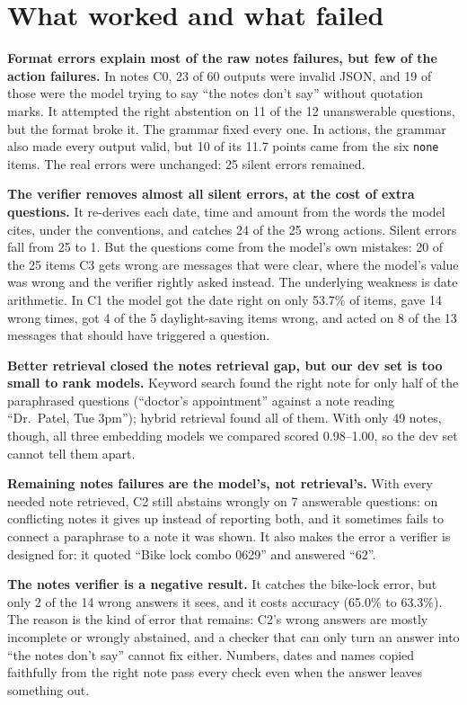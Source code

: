 \documentclass[10pt,letterpaper]{article}
\begin{document}
\section{What worked and what failed}
\textbf{Format errors explain most of the raw notes failures, but few of the action failures.} In notes C0, 23 of 60 outputs were invalid JSON, and 19 of those were the model trying to say ``the notes don't say'' without quotation marks. It attempted the right abstention on 11 of the 12 unanswerable questions, but the format broke it. The grammar fixed every one. In actions, the grammar also made every output valid, but 10 of its 11.7 points came from the six \texttt{none} items. The real errors were unchanged: 25 silent errors remained.

\textbf{The verifier removes almost all silent errors, at the cost of extra questions.} It re-derives each date, time and amount from the words the model cites, under the conventions, and catches 24 of the 25 wrong actions. Silent errors fall from 25 to 1. But the questions come from the model's own mistakes: 20 of the 25 items C3 gets wrong are messages that were clear, where the model's value was wrong and the verifier rightly asked instead. The underlying weakness is date arithmetic. In C1 the model got the date right on only 53.7\% of items, gave 14 wrong times, got 4 of the 5 daylight-saving items wrong, and acted on 8 of the 13 messages that should have triggered a question.

\textbf{Better retrieval closed the notes retrieval gap, but our dev set is too small to rank models.} Keyword search found the right note for only half of the paraphrased questions (``doctor's appointment'' against a note reading ``Dr.\ Patel, Tue 3pm''); hybrid retrieval found all of them. With only 49 notes, though, all three embedding models we compared scored 0.98--1.00, so the dev set cannot tell them apart.

\textbf{Remaining notes failures are the model's, not retrieval's.} With every needed note retrieved, C2 still abstains wrongly on 7 answerable questions: on conflicting notes it gives up instead of reporting both, and it sometimes fails to connect a paraphrase to a note it was shown. It also makes the error a verifier is designed for: it quoted ``Bike lock combo 0629'' and answered ``62''.

\textbf{The notes verifier is a negative result.} It catches the bike-lock error, but only 2 of the 14 wrong answers it sees, and it costs accuracy (65.0\% to 63.3\%). The reason is the kind of error that remains: C2's wrong answers are mostly incomplete or wrongly abstained, and a checker that can only turn an answer into ``the notes don't say'' cannot fix either. Numbers, dates and names copied faithfully from the right note pass every check even when the answer leaves something out.
\end{document}
